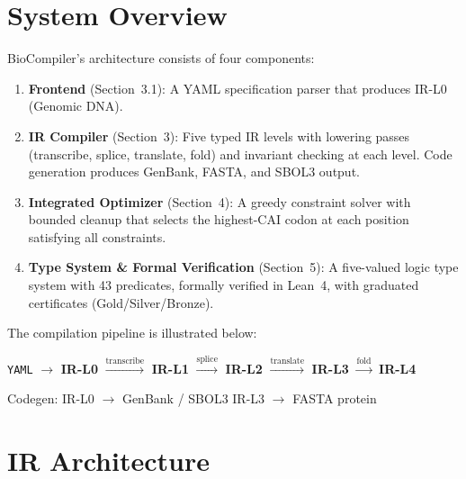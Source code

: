 \documentclass[11pt,a4paper]{article}
\theoremstyle{definition}
\begin{document}
\section{System Overview}\label{sec:overview}

BioCompiler's architecture consists of four components:

\begin{enumerate}[leftmargin=*,itemsep=2pt]
\item \textbf{Frontend} (Section~3.1): A YAML specification parser that produces IR-L0 (Genomic DNA).

\item \textbf{IR Compiler} (Section~3): Five typed IR levels with lowering passes (transcribe, splice, translate, fold) and invariant checking at each level. Code generation produces GenBank, FASTA, and SBOL3 output.

\item \textbf{Integrated Optimizer} (Section~4): A greedy constraint solver with bounded cleanup that selects the highest-CAI codon at each position satisfying all constraints.

\item \textbf{Type System \& Formal Verification} (Section~5): A five-valued logic type system with 43 predicates, formally verified in Lean~4, with graduated certificates (Gold/Silver/Bronze).
\end{enumerate}

The compilation pipeline is illustrated below:
\begin{center}
\large
\texttt{YAML} $\to$ \textbf{IR-L0} $\xrightarrow{\text{transcribe}}$ \textbf{IR-L1} $\xrightarrow{\text{splice}}$ \textbf{IR-L2} $\xrightarrow{\text{translate}}$ \textbf{IR-L3} $\xrightarrow{\text{fold}}$ \textbf{IR-L4}
\end{center}
\begin{center}
\small
Codegen: IR-L0 $\to$ GenBank / SBOL3 \qquad IR-L3 $\to$ FASTA protein
\end{center}

\section{IR Architecture}\label{sec:ir}
\end{document}
